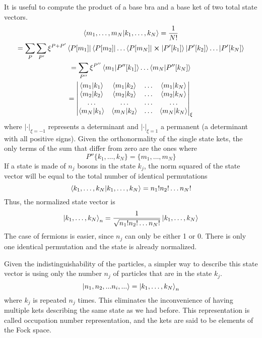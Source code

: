 It is useful to compute the product of a base bra and a base ket of two total state vectors.
\begin{multline} \label{eq:base_product}
    \bra{m_1, \dots, m_N} \ket{k_1, \dots, k_N} = \frac{1}{N!}
    \\ = \sum_P \sum_{P'} \xi^{P+P'} \bra{P[m_1]}\bra{P[m_2]}\dots\bra{P[m_N]} \cross \ket{P'[k_1]}\ket{P'[k_2]}\dots\ket{P'[k_N]}
    \\ = \sum_{P''} \xi^{P''} \braket{m_1}{P''[k_1]} \dots \braket{m_N}{P''[k_N]}
    \\ = \begin{vmatrix}
        \braket{m_1}{k_1} & \braket{m_1}{k_2} & \dots & \braket{m_1}{k_N} \\
        \braket{m_2}{k_2} & \braket{m_2}{k_2} & \dots & \braket{m_2}{k_N} \\
        \dots             & \dots             & \dots & \dots             \\
        \braket{m_N}{k_1} & \braket{m_N}{k_2} & \dots & \braket{m_N}{k_N}
    \end{vmatrix}_\xi
\end{multline}
where $|\cdot|_{\xi = -1}$ represents a determinant and $|\cdot|_{\xi = 1}$ a permanent (a determinant with all positive signs). Given the orthonormality of the single state kets, the only terms of the sum that differ from zero are the ones where
\begin{equation}
    P''\{k_1, \dots, k_N\} = \{m_1, \dots, m_N\}
\end{equation}
If a state is made of $n_j$ bosons in the state $k_j$, the norm squared of the state vector will be equal to the total number of identical permutations
\begin{equation}
    \braket{k_1, \dots, k_N} = n_1!n_2!\dots n_N!
\end{equation}
Thus, the normalized state vector is
\begin{equation}
    \ket{k_1, \dots, k_N}_n= \frac{1}{\sqrt{n_1!n_2!\dots n_N!}} \ket{k_1, \dots, k_N}
\end{equation}
The case of fermions is easier, since $n_j$ can only be either 1 or 0. There is only one identical permutation and the state is already normalized.

Given the indistinguishability of the particles, a simpler way to describe this state vector is using only the number $n_j$ of particles that are in the state $k_j$.
\begin{equation} \label{eq:occupation_definition}
    \ket{n_1, n_2, ... n_i, ...} = \ket{k_1, \dots, k_N}_n
\end{equation}
where $k_j$ is repeated $n_j$ times. This eliminates the inconvenience of having multiple kets describing the same state as we had before. This representation is called occupation number representation, and the kets are said to be elements of the Fock space.

